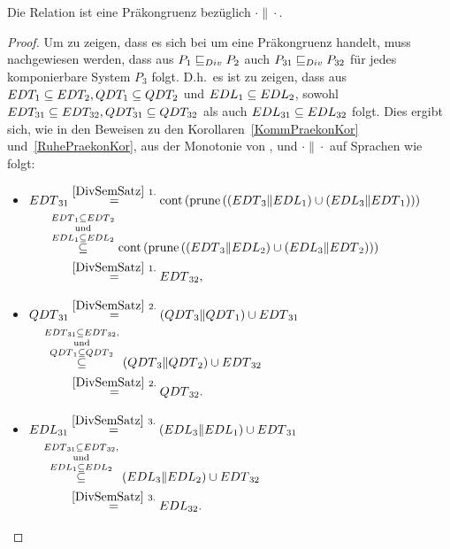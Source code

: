 \begin{Kor}
  Die Relation \DRel{} ist eine Präkongruenz bezüglich $\cdot\|\cdot$.
\end{Kor}
\begin{proof}
  Um zu zeigen, dass es sich bei \DRel{} um eine Präkongruenz handelt, muss
  nachgewiesen werden, dass aus $P_1 \sqsubseteq  _{Div} P_2$ auch $P_{31} \sqsubseteq  _{Div} P_{32}$ für
  jedes komponierbare System $P_3$ folgt. D.h.\ es ist zu zeigen, dass aus
  $EDT _1\subseteq EDT _2, QDT _1\subseteq QDT _2$ und $EDL _1\subseteq EDL
  _2$, sowohl $EDT _{31} \subseteq EDT _{32}, QDT _{31} \subseteq QDT
  _{32}$ als auch $EDL _{31}\subseteq EDL _{32}$ folgt. Dies ergibt sich, wie
  in den Beweisen zu den Korollaren~\ref{KommPraekonKor}
  und~\ref{RuhePraekonKor}, aus der Monotonie von \cont{}, \prune{} und
  $\cdot\|\cdot$ auf Sprachen wie folgt:
  \begin{itemize}
    \item $\begin{aligned}[t]
        \EDT{}_{31} &\overset{\ref{DivSemSatz}~1.}{=}
        \cont{}\left(\prune{}\left(\left(\EDT{}_3\|\EDL{}_1\right) \cup
        \left(\EDL{}_3\|\EDT{}_1\right)\right)\right)\\
        &\hspace{-0.6cm}\overset{\EDT{}_1\subseteq
      \EDT{}_2}{\overset{\mathrm{und}}{\overset{\EDL{}_1\subseteq
    \EDL{}_2}{\subseteq}}}
    \cont{}\left(\prune{}\left(\left(\EDT{}_3\|\EDL{}_2\right) \cup
        \left(\EDL{}_3\|\EDT{}_2\right)\right)\right)\\
      &\overset{\ref{DivSemSatz}~1.}{=} \EDT{}_{32},
    \end{aligned}$
    \item $\begin{aligned}[t]
        \QDT{}_{31} &\overset{\ref{DivSemSatz}~2.}{=} (\QDT{}_3\|\QDT{}_1)
        \cup \EDT{}_{31}\\
        &\hspace{-0.8cm}\overset{\EDT{}_{31}\subseteq
      \EDT{}_{32},}{\overset{\mathrm{und}}{\overset{\QDT{}_1\subseteq
      \QDT{}_2}{\subseteq}}} (\QDT{}_3\|\QDT{}_2) \cup \EDT{}_{32}\\
      &\overset{\ref{DivSemSatz}~2.}{=} \QDT{}_{32}.
    \end{aligned}$
    \item $\begin{aligned}[t]
        \EDL{}_{31} &\overset{\ref{DivSemSatz}~3.}{=} (\EDL{}_3\|\EDL{}_1)
        \cup \EDT{}_{31}\\
        &\hspace{-0.8cm}\overset{\EDT{}_{31}\subseteq
      \EDT{}_{32},}{\overset{\mathrm{und}}{\overset{\EDL{}_1\subseteq
      \EDL{}_2}{\subseteq}}} (\EDL{}_3\|\EDL{}_2) \cup \EDT{}_{32}\\
      &\overset{\ref{DivSemSatz}~3.}{=} \EDL{}_{32}.
    \end{aligned}$
  \end{itemize}
\end{proof}

